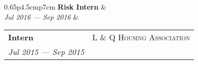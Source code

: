 \documentclass[10pt]{article}
\begin{document}
\begin{minipage}[t]{0.65\linewidth}
\begin{tabularx}{0.65\linewidth}{p{4.5cm}p{7cm}}
\textbf{Risk Intern} &                    \\
\textit{Jul 2016 --- Sep 2016} & \\                 
\end{tabularx}
\vspace{0.1cm}

\begin{tabularx}{0.65\linewidth}{p{4.5cm}p{7cm}}
\textbf{Intern} & \multicolumn{1}{r}{\textsc{L \& Q Housing Association}}                  \\
\textit{Jul 2015 --- Sep 2015} &                  
\end{tabularx}


\end{minipage}
\end{document}
